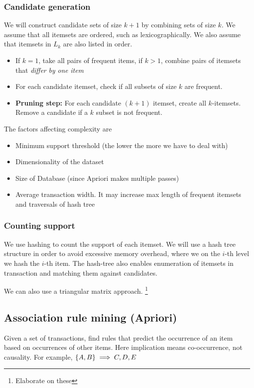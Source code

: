     \subsubsection{Candidate generation}
        We will construct candidate sets of size $k+1$ by combining sets of size $k$. We assume that all itemsets are ordered, such as lexicographically. We also assume that itemsets in $L_k$ are also listed in order.
        \begin{itemize}
            \item If $k=1$, take all pairs of frequent items, if $k > 1$, combine pairs of itemsets that \emph{differ by one item}
            \item For each candidate itemset, check if all subsets of size $k$ are frequent.
            \item \textbf{Pruning step:} For each candidate $(k+1)$ itemset, create all $k$-itemsets. Remove a candidate if a $k$ subset is not frequent. 
        \end{itemize}
    
    The factors affecting complexity are 
    \begin{itemize}
        \item Minimum support threshold (the lower the more we have to deal with)
        \item Dimensionality of the dataset
        \item Size of Database (since Apriori makes multiple passes)
        \item Average transaction width. It may increase max length of frequent itemsets and traversals of hash tree
    \end{itemize}
    
    \subsubsection{Counting support}
        We use hashing to count the support of each itemset. We will use a hash tree structure in order to avoid excessive memory overhead, where we on the $i$-th level we hash the $i$-th item. The hash-tree also enables enumeration of itemsets in transaction and matching them against candidates. 
        
        We can also use a triangular matrix approach. \footnote{Elaborate on these}
        
    \subsection{Association rule mining (Apriori)}
        Given a set of transactions, find rules that predict the occurrence of an item based on occurrences of other items. Here implication means co-occurrence, not causality. For example, $\{A, B\} \implies {C, D, E}$
        
